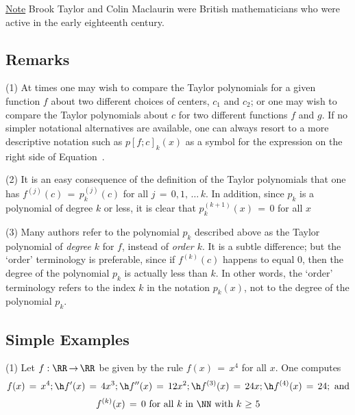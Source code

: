 {        \underline{Note} Brook Taylor and Colin Maclaurin were British mathematicians who were active in the early eighteenth century.

\VV

            \subsection{\small{\bf Remarks}}
            \label{RemrkE60.25}

\V


\hspace*{\parindent}(1) At times one may wish to compare the Taylor polynomials for a given function $f$ about two different choices of centers, $c_{1}$ and $c_{2}$;
    or one may wish to compare the Taylor polynomials about $c$ for two different functions $f$ and $g$.
    If no simpler notational alternatives are available, one can always resort to a more descriptive notation such as
    $p[f;c]_{k}(x)$ as a symbol for the expression on the right side of Equation~.

\V

        (2) It is an easy consequence of the definition of the Taylor polynomials that one has $f^{(j)}(c) \,=\, p_{k}^{(j)}(c)$ for all $j \,=\, 0,1,\,{\ldots}\,k$.
    In addition, since $p_{k}$ is a polynomial of degree $k$ or less, it is clear that $p_{k}^{(k+1)}(x) \,=\, 0$ for all $x$

\V

        (3) Many authors refer to the polynomial $p_{k}$ described above as the Taylor polynomial of {\em degree} $k$ for $f$, instead of {\em order $k$}.
    It is a subtle difference; but the `order' terminology is preferable, since if $f^{(k)}(c)$ happens to equal $0$, then the degree of the polynomial $p_{k}$ is actually less than $k$.
    In other words, the `order' terminology refers to the index $k$ in the notation $p_{k}(x)$, not to the degree of the polynomial $p_{k}$.

\VV

            \subsection{\small{\bf Simple Examples}}
            \label{ExampE60.30}

\V

\hspace*{\parindent}(1) Let $f:{\RR} \,{\rightarrow}\, {\RR}$ be given by the rule $f(x) \,=\, x^{4}$ for all $x$.
    One computes
        \begin{displaymath}
        f(x) \,=\, x^{4}; \h f'(x) \,=\, 4x^{3}; \h f''(x) \,=\, 12x^{2}; \h f^{(3)}(x) \,=\, 24x; \h f^{(4)}(x) \,=\, 24; \mbox{ and}
        \end{displaymath}
        \begin{displaymath}
         f^{(k)}(x) \,=\, 0
\mbox{ for all $k$ in ${\NN}$ with $k\,\,{\geq}\,\,5$}
        \end{displaymath}

}
